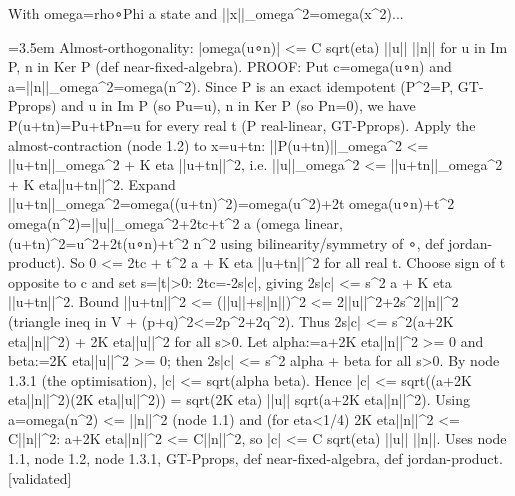 \documentclass{article}
\newcommand{\step}[1]{\par\noindent\hangindent=3.5em\hangafter=1%
  \makebox[3.5em][l]{\textbf{#1.}}}
\newcommand{\steptag}[1]{\hfill{\small\textsf{[#1]}}}
\begin{document}
\begin{proofbox}{With omega=rho∘Phi a state and ||x||\_omega\textasciicircum{}2=omega(x\textasciicircum{}2)...}
\step{1.3} Almost-orthogonality: |omega(u∘n)| <= C sqrt(eta) ||u|| ||n|| for u in Im P, n in Ker P (def near-fixed-algebra). PROOF: Put c=omega(u∘n) and a=||n||\_omega\textasciicircum{}2=omega(n\textasciicircum{}2). Since P is an exact idempotent (P\textasciicircum{}2=P, GT-Pprops) and u in Im P (so Pu=u), n in Ker P (so Pn=0), we have P(u+tn)=Pu+tPn=u for every real t (P real-linear, GT-Pprops). Apply the almost-contraction (node 1.2) to x=u+tn: ||P(u+tn)||\_omega\textasciicircum{}2 <= ||u+tn||\_omega\textasciicircum{}2 + K eta ||u+tn||\textasciicircum{}2, i.e. ||u||\_omega\textasciicircum{}2 <= ||u+tn||\_omega\textasciicircum{}2 + K eta||u+tn||\textasciicircum{}2. Expand ||u+tn||\_omega\textasciicircum{}2=omega((u+tn)\textasciicircum{}2)=omega(u\textasciicircum{}2)+2t omega(u∘n)+t\textasciicircum{}2 omega(n\textasciicircum{}2)=||u||\_omega\textasciicircum{}2+2tc+t\textasciicircum{}2 a (omega linear, (u+tn)\textasciicircum{}2=u\textasciicircum{}2+2t(u∘n)+t\textasciicircum{}2 n\textasciicircum{}2 using bilinearity/symmetry of ∘, def jordan-product). So 0 <= 2tc + t\textasciicircum{}2 a + K eta ||u+tn||\textasciicircum{}2 for all real t. Choose sign of t opposite to c and set s=|t|>0: 2tc=-2s|c|, giving 2s|c| <= s\textasciicircum{}2 a + K eta ||u+tn||\textasciicircum{}2. Bound ||u+tn||\textasciicircum{}2 <= (||u||+s||n||)\textasciicircum{}2 <= 2||u||\textasciicircum{}2+2s\textasciicircum{}2||n||\textasciicircum{}2 (triangle ineq in V + (p+q)\textasciicircum{}2<=2p\textasciicircum{}2+2q\textasciicircum{}2). Thus 2s|c| <= s\textasciicircum{}2(a+2K eta||n||\textasciicircum{}2) + 2K eta||u||\textasciicircum{}2 for all s>0. Let alpha:=a+2K eta||n||\textasciicircum{}2 >= 0 and beta:=2K eta||u||\textasciicircum{}2 >= 0; then 2s|c| <= s\textasciicircum{}2 alpha + beta for all s>0. By node 1.3.1 (the optimisation), |c| <= sqrt(alpha beta). Hence |c| <= sqrt((a+2K eta||n||\textasciicircum{}2)(2K eta||u||\textasciicircum{}2)) = sqrt(2K eta) ||u|| sqrt(a+2K eta||n||\textasciicircum{}2). Using a=omega(n\textasciicircum{}2) <= ||n||\textasciicircum{}2 (node 1.1) and (for eta<1/4) 2K eta||n||\textasciicircum{}2 <= C||n||\textasciicircum{}2: a+2K eta||n||\textasciicircum{}2 <= C||n||\textasciicircum{}2, so |c| <= C sqrt(eta) ||u|| ||n||. Uses node 1.1, node 1.2, node 1.3.1, GT-Pprops, def near-fixed-algebra, def jordan-product. \steptag{validated} \\[6pt]

\end{proofbox}
\end{document}
